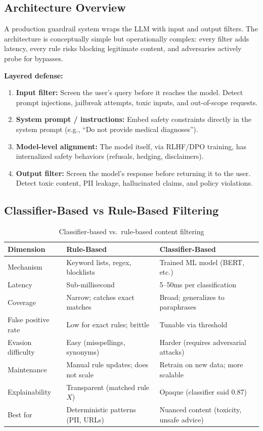\subsection{Architecture Overview}

A production guardrail system wraps the LLM with input and output filters. The architecture is conceptually simple but operationally complex: every filter adds latency, every rule risks blocking legitimate content, and adversaries actively probe for bypasses.

\textbf{Layered defense:}
\begin{enumerate}
    \item \textbf{Input filter:} Screen the user's query before it reaches the model. Detect prompt injections, jailbreak attempts, toxic inputs, and out-of-scope requests.
    \item \textbf{System prompt / instructions:} Embed safety constraints directly in the system prompt (e.g., ``Do not provide medical diagnoses'').
    \item \textbf{Model-level alignment:} The model itself, via RLHF/DPO training, has internalized safety behaviors (refusals, hedging, disclaimers).
    \item \textbf{Output filter:} Screen the model's response before returning it to the user. Detect toxic content, PII leakage, hallucinated claims, and policy violations.
\end{enumerate}

\subsection{Classifier-Based vs Rule-Based Filtering}

\begin{table}[H]
\centering
\caption{Classifier-based vs.\ rule-based content filtering}
\begin{tabularx}{\textwidth}{lXX}
\toprule
\textbf{Dimension} & \textbf{Rule-Based} & \textbf{Classifier-Based} \\
\midrule
Mechanism & Keyword lists, regex, blocklists & Trained ML model (BERT, etc.) \\
Latency & Sub-millisecond & 5--50ms per classification \\
Coverage & Narrow; catches exact matches & Broad; generalizes to paraphrases \\
False positive rate & Low for exact rules; brittle & Tunable via threshold \\
Evasion difficulty & Easy (misspellings, synonyms) & Harder (requires adversarial attacks) \\
Maintenance & Manual rule updates; does not scale & Retrain on new data; more scalable \\
Explainability & Transparent (matched rule $X$) & Opaque (classifier said 0.87) \\
Best for & Deterministic patterns (PII, URLs) & Nuanced content (toxicity, unsafe advice) \\
\bottomrule
\end{tabularx}
\end{table}

